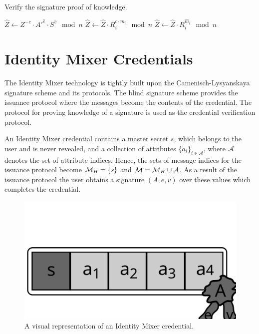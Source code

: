 \begin{algorithm}[t]
  \caption{Verify the signature proof of knowledge.}
  \label{alg:CL-verify-D}
  \addtolength{\baselineskip}{1.5mm}

  \begin{algorithmic}[1]
      \State $\hat{Z} \gets Z^{-c} \cdot A'^{\hat{e}} \cdot S^{\hat{v}} \mod n$
        \State $\hat{Z} \gets \hat{Z} \cdot R_i^{c \cdot m_i} \mod n$
      \EndFor
        \State $\hat{Z} \gets \hat{Z} \cdot R_i^{\hat{m}_i} \mod n$
      \EndFor

        \Return {}
      \EndIf
      \Return {}
    \EndFunction
  \end{algorithmic}
\end{algorithm}

\section{Identity Mixer Credentials}

The Identity Mixer technology is tightly built upon the Camenisch-Lysyanskaya
signature scheme and its protocols. The blind signature scheme provides the
issuance protocol where the messages become the contents of the credential. The
protocol for proving knowledge of a signature is used as the credential
verification protocol.

An Identity Mixer credential contains a master secret $s$, which belongs to the
user and is never revealed, and a collection of attributes
$\{a_i\}_{i \in \mathcal{A}}$, where $\mathcal{A}$ denotes the set of
attribute indices. Hence, the sets of message indices for the issuance protocol
become $\mathcal{M}_H = \{s\}$ and $\mathcal{M} = \mathcal{M}_H \cup \mathcal{A}$. As a result of the
issuance protocol the user obtains a signature $(A, e, v)$ over these values
which completes the credential.

\clearpage
\begin{figure}[ht]
  \centering
  \includegraphics[scale=.45]{images/idemix-credential}
  \caption{A visual representation of an Identity Mixer credential.}
  \label{fig:idemix-credential}
\end{figure}

